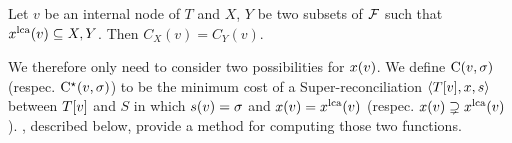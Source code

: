 \begin{lemma}\label{lem:superdtl:subset-2cases}
    Let \(v\) be an internal node of \(T\) and \(X\), \(Y\) be two subsets of \(\mathcal{F}\) such that \(x^{\mathrm{lca}}(v) \subseteq X, Y\). Then \(C_X(v) =C_Y(v)\).
\end{lemma}

We therefore only need to consider two possibilities for \(x(v)\). We define \(\mathrm{C}(v, \sigma)\) (respec. \(\mathrm{C^\star}(v, \sigma)\)) to be the minimum cost of a Super-reconciliation \(\left\langle T[v], x, s\right\rangle\) between \(T[v]\) and \(S\) in which \(s(v) = \sigma\) and \(x(v) = x^{\mathrm{lca}}(v)\) (respec. \(x(v) \supsetneq x^{\mathrm{lca}}(v)\)).
, described below, provide a method for computing those two functions.

